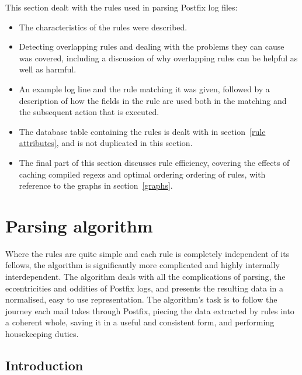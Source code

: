 \documentclass[a4paper,12pt,draft]{article}
\begin{document}
This section dealt with the rules used in parsing Postfix log files:

\begin{itemize}

    \item The characteristics of the rules were described.

    \item Detecting overlapping rules and dealing with the problems they
        can cause was covered, including a discussion of why overlapping
        rules can be helpful as well as harmful.

    \item An example log line and the rule matching it was given, followed
        by a description of how the fields in the rule are used both in the
        matching and the subsequent action that is executed.

    \item The database table containing the rules is dealt with in
        section~\ref{rule attributes}, and is not duplicated in this
        section.

    \item The final part of this section discusses rule efficiency,
        covering the effects of caching compiled regexs and optimal
        ordering ordering of rules, with reference to the graphs in
        section~\ref{graphs}.

\end{itemize}

\section{Parsing algorithm}

\label{parsing-algorithm}

Where the rules are quite simple and each rule is completely independent of
its fellows, the algorithm is significantly more complicated and highly
internally interdependent.  The algorithm deals with all the complications
of parsing, the eccentricities and oddities of Postfix logs, and presents
the resulting data in a normalised, easy to use representation.  The
algorithm's task is to follow the journey each mail takes through Postfix,
piecing the data extracted by rules into a coherent whole, saving it in a
useful and consistent form, and performing housekeeping duties.

\subsection{Introduction}
\end{document}
